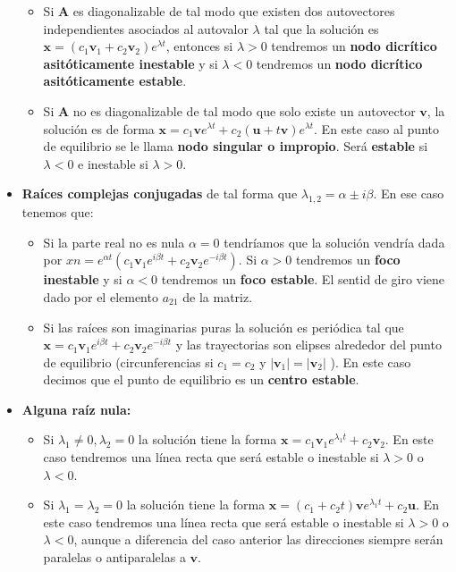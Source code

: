 \documentclass[12pt,a4paper]{article}
\numberwithin{equation}{section}
\numberwithin{figure}{section}
\newcommand{\vn}{\mathbf{v}}
\newcommand{\xn}{\mathbf{x}}
\newcommand{\An}{\mathbf{A}}
\newcommand{\un}{\mathbf{u}}
\begin{document}
\begin{itemize}
\begin{itemize}
\item Si $\An$ es diagonalizable de tal modo que existen dos autovectores independientes asociados al autovalor $\lambda$ tal  que la solución es $\xn = (c_1 \vn_1 + c_2 \vn_2) e^{\lambda t}$, entonces si $\lambda>0$ tendremos un \textbf{nodo dicrítico asitóticamente inestable} y si $\lambda<0$ tendremos un \textbf{nodo dicrítico asitóticamente estable}.

\item Si $\An$ no es diagonalizable de tal modo que solo existe un autovector $\vn$, la solución es de forma $\xn = c_1 \vn e^{\lambda t} + c_2 (\un + t \vn) e^{\lambda t}$. En este caso al punto de equilibrio se le llama \textbf{nodo singular o impropio}. Será \textbf{estable} si $\lambda<0$ e inestable si $\lambda>0$.
\end{itemize}

\item \textbf{Raíces complejas conjugadas} de tal forma que $\lambda_{1,2} = \alpha \pm i \beta$. En ese caso tenemos que:

\begin{itemize}
\item Si la parte real no es nula $\alpha = 0$ tendríamos que la solución vendría dada por $xn = e^{\alpha t} (c_1 \vn_1 e^{i \beta t} + c_2 \vn_2 e^{-i \beta t})$. Si $\alpha > 0$ tendremos un \textbf{foco inestable} y si $\alpha < 0$ tendremos un \textbf{foco estable}. El sentid de giro viene dado por el elemento $a_{21}$ de la matriz.

\item Si las raíces son imaginarias puras la solución es periódica tal que $\xn = c_1 \vn_1 e^{i \beta t} + c_2 \vn_2 e^{-i \beta t}$ y las trayectorias son elipses alrededor del punto de equilibrio (circunferencias si $c_1 = c_2$ y $|\vn_1|=|\vn_2|$ ).  En este caso decimos que el punto de equilibrio es un \textbf{centro estable}.

\end{itemize}

\item \textbf{Alguna raíz nula:}

\begin{itemize}
\item Si $\lambda_1 \neq 0, \lambda_2 = 0$ la solución tiene la forma $\xn = c_1 \vn_1 e^{\lambda_1 t} + c_2 \vn_2$. En este caso tendremos una línea recta que será estable o inestable si $\lambda>0$ o $\lambda<0$.
\item Si $\lambda_1 = \lambda_2 = 0$ la solución tiene la forma $\xn = (c_1+c_2 t) \vn e^{\lambda_1 t} + c_2 \un$. En este caso tendremos una línea recta que será estable o inestable si $\lambda>0$ o $\lambda<0$, aunque a diferencia del caso anterior las direcciones siempre serán paralelas o antiparalelas a $\vn$.
\end{itemize}

\end{itemize}
\end{document}
